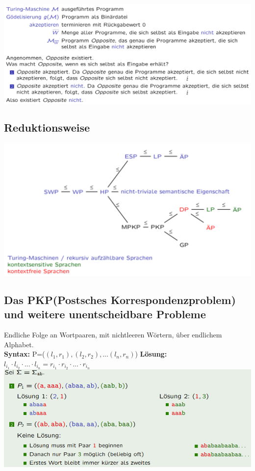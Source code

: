 \documentclass[12pt,a4paper]{article}
\begin{document}
\includegraphics[width=\textwidth]{Bilder/SpeziellesWortproblem.png}

	\subsection{Reduktionsweise}
	\includegraphics[scale=0.4]{Bilder/Zusammenfassung_Unentscheidbarkeiten.png}

	\subsection{Das PKP(Postsches Korrespondenzproblem) und weitere unentscheidbare Probleme}
	Endliche Folge an Wortpaaren, mit nichtleeren Wörtern, über endlichem Alphabet.\\
	\textbf{Syntax:} P=($(l_1, r_1), (l_2, r_2), ...(l_n, r_n)$) \hfill \textbf{Lösung:} $l_{i_1} \cdot l_{i_2} \cdot ... \cdot l_{i_n} = r_{i_1} \cdot r_{i_2} \cdot ... \cdot r_{i_n}$\\
	\includegraphics[width=\textwidth]{Bilder/pkp.PNG}
\end{document}
